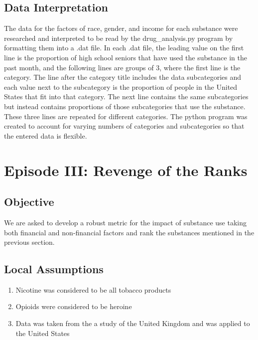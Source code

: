 \documentclass{article}
\begin{document}
    \subsection{Data Interpretation}
    The data for the factors of race, gender, and income for each substance were researched and interpreted to be read by the drug\_analysis.py program by formatting them into a .dat file. In each .dat file, the leading value on the first line is the proportion of high school seniors that have used the substance in the past month, and the following lines are groups of 3, where the first line is the category. The line after the category title includes the data subcategories and each value next to the subcategory is the proportion of people in the United States that fit into that category. The next line contains the same subcategories but instead contains proportions of those subcategories that use the substance. These three lines are repeated for different categories. The python program was created to account for varying numbers of categories and subcategories so that the entered data is flexible.
\newpage

\section{Episode III: Revenge of the Ranks}
\subsection{Objective}
We are asked to develop a robust metric for the impact of substance use taking both financial and non-financial factors and rank the substances mentioned in the previous section.
    
\subsection{Local Assumptions}
\begin{enumerate}
    \item Nicotine was considered to be all tobacco products 
    \item Opioids were considered to be heroine
    \item Data was taken from the a study of the United Kingdom and was applied to the United States
\end{enumerate} 
\end{document}
